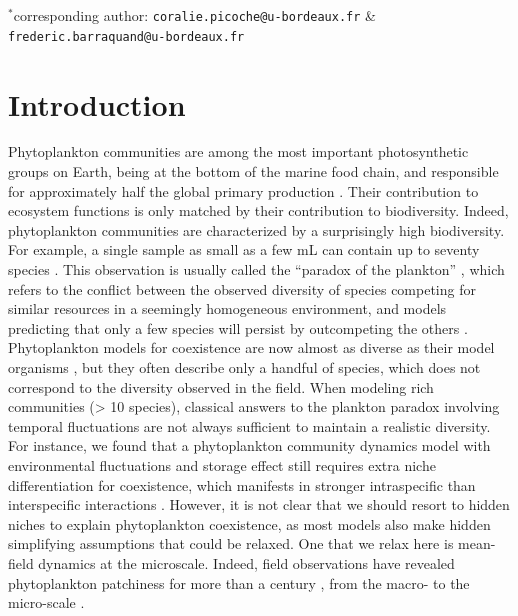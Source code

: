 \documentclass[english]{article}
\begin{document}
$^{*}$corresponding author: \verb|coralie.picoche@u-bordeaux.fr| \& \verb|frederic.barraquand@u-bordeaux.fr|

\doublespacing

\clearpage{}


\section*{Introduction}

Phytoplankton communities are among the most important photosynthetic
groups on Earth, being at the bottom of the marine food chain, and
responsible for approximately half the global primary production \citep{field_primary_1998}.
Their contribution to ecosystem functions is only matched by their
contribution to biodiversity. Indeed, phytoplankton communities are
characterized by a surprisingly high biodiversity. For example, a
single sample as small as a few mL can contain up to seventy species
\citep{REPHY_db,widdicombe_2021}. This observation is usually called
the ``paradox of the plankton'' \citep{hutchinson_paradox_1961},
which refers to the conflict between the observed diversity of species
competing for similar resources in a seemingly homogeneous environment,
and models predicting that only a few species will persist by outcompeting
the others \citep{macarthur_competition_1964,huisman_biodiversity_1999,schippers_does_2001}.
Phytoplankton models for coexistence are now almost as diverse as
their model organisms \citep{record_paradox_2014}, but they often
describe only a handful of species, which does not correspond to the
diversity observed in the field. When modeling rich communities (\textgreater{}
10 species), classical answers to the plankton paradox involving temporal
fluctuations \citep[e.g.,][]{li_effects_2016,chesson_updates_2018}
are not always sufficient to maintain a realistic diversity. For instance,
we found that a phytoplankton community dynamics model with environmental
fluctuations and storage effect still requires extra niche differentiation
for coexistence, which manifests in stronger intraspecific than interspecific
interactions \citep{picoche_how_2019}. However, it is not clear
that we should resort to hidden niches to explain phytoplankton coexistence,
as most models also make hidden simplifying assumptions that could
be relaxed. One that we relax here is mean-field dynamics at the microscale.
Indeed, field observations have revealed phytoplankton patchiness
for more than a century \citep{bainbridge_size_1957,stocker_marine_2012},
from the macro- to the micro-scale \citep{leonard_interannual_2001,doubell_high-resolution_2006,font-munoz_advection_2017}.
\end{document}
